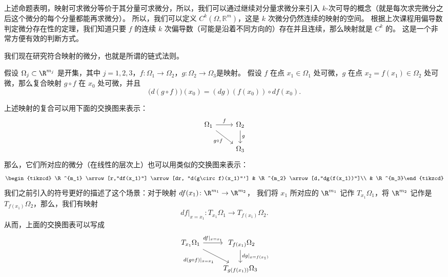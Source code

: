 \begin{rem}
上述命题表明，映射可求微分等价于其分量可求微分，所以，我们可以通过继续对分量求微分来引入 $k$-次可导的概念（就是每次求完微分之后这个微分的每个分量都能再求微分）。
所以，我们可以定义 $C^k(\Omega,\mathbb{R}^m)$，这是 $k$ 次微分仍然连续的映射的空间。
根据上次课程用偏导数判定微分存在性的定理，我们知道只要 $f$ 的连续 $k$ 次偏导数（可能是沿着不同方向的）存在并且{\color{red}连续}，那么映射就是 $C^k$ 的。
这是一个非常方便有效的判断方式。
\end{rem}

我们现在研究符合映射的微分，也就是所谓的链式法则。
\begin{prop}[链式法则]
假设 $\Omega_j \subset \R^{m_j}$ 是开集，其中 $j=1,2,3$，$f\colon\Omega_1\rightarrow \Omega_2$，$g\colon\Omega_2\rightarrow \Omega_3$是映射。
假设 $f$ 在点 $x_1\in \Omega_1$ 处可微，$g$ 在点 $x_2=f(x_1)\in \Omega_2$ 处可微，那么复合映射 $g \circ f$ 在 $x_0$ 处可微，并且
\[\bigl(d (g\circ f) \bigr)(x_0)=(dg)(f(x_0))\circ df(x_0).\]
\end{prop}

\begin{rem}
上述映射的复合可以用下面的交换图来表示：
\[\begin{tikzcd}
  \Omega_1 \arrow[r,"f"] \arrow[dr, "g\circ f"']
    & \Omega_2 \arrow[d,"g"]\\
&\Omega_3 \end{tikzcd}\]
那么，它们所对应的微分（在线性的层次上）也可以用类似的交换图来表示：
\[\begin{tikzcd}
  \R^{m_1} \arrow[r,"df(x_1)"] \arrow[dr, "d(g\circ f)(x_1)"']
    &   \R^{m_2} \arrow[d,"dg(f(x_1))"]\\
&  \R^{m_3}\end{tikzcd}\]
我们之前引入的符号更好的描述了这个场景：对于映射 $df(x_1)\colon \R^{m_1}\rightarrow \R^{m_2}$，
我们将 $x_1$ 所对应的 $\R^{m_1}$ 记作 $T_{x_1}\Omega_1$，将 $\R^{m_2}$ 记作是 $T_{f(x_1)}\Omega_2$，那么，我们有映射
\[df\bigl|_{x=x_1}\colon T_{x_1}\Omega_1\rightarrow T_{f(x_1)}\Omega_2.\]
从而，上面的交换图表可以写成
\[\begin{tikzcd}
  T_{x_1}\Omega_1 \arrow[r,"df|_{x=x_1}"] \arrow[dr, "d(g\circ f)|_{x=x_1}"']
    &   \ T_{f(x_1)}\Omega_2 \arrow[d,"dg|_{x=f(x_1)}"]\\
&   T_{g(f(x_1))}\Omega_3 \end{tikzcd}\]
\end{rem}

